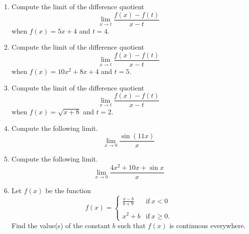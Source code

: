 \documentclass{article}
\begin{document}
\ActivityTitle[class=Calculus I, number=2, name=Continuity]

\begin{enumerate}
\item Compute the limit of the difference quotient \[ \lim_{x \rightarrow t} \frac{f(x) - f(t)}{x - t} \] when $f(x) = 5 x + 4$ and $t = 4$.



  
\vspace{5cm}

\item Compute the limit of the difference quotient \[ \lim_{x \rightarrow t} \frac{f(x) - f(t)}{x - t} \] when $f(x) = 10 x^2 + 8 x + 4$ and $t = 5$.



  
\vspace{5cm}

\item Compute the limit of the difference quotient \[ \lim_{x \rightarrow t} \frac{f(x) - f(t)}{x - t} \] when $f(x) = \sqrt{x + 8}$ and $t = 2$.



  
\vspace{5cm}

\item Compute the following limit. \[ \lim_{x \rightarrow 0} \frac{\sin(11 x)}{x} \]



  
\vspace{5cm}

\item Compute the following limit. \[ \lim_{x \rightarrow 0} \frac{4 x^2 + 10 x + \sin x}{x} \]



  
\vspace{5cm}

\item Let $f(x)$ be the function \[ f(x) = \left\{ \begin{array}{ll} \frac{x-b}{b + 9} & \mathrm{if}\ x < 0 \\ & \\ x^2 + b & \mathrm{if}\ x \geq 0. \end{array}\right. \] Find the value(s) of the constant $b$ such that $f(x)$ is continuous everywhere.



  
\vspace{5cm}
\end{enumerate}
\end{document}
